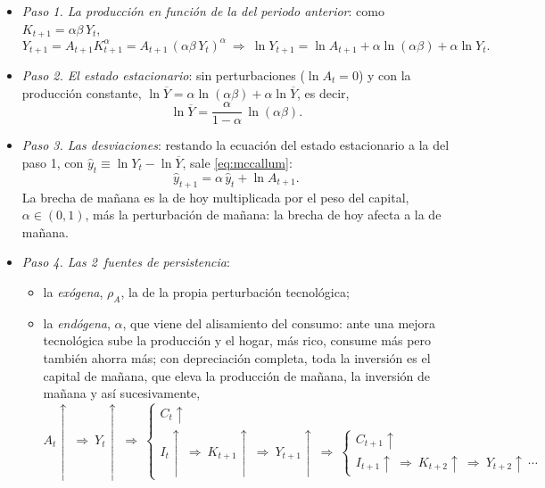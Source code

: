 \documentclass[11pt]{article}
\begin{document}
\begin{itemize}
\item \emph{Paso 1. La producción en función de la del periodo anterior}: como $K_{t+1}=\alpha\beta\,Y_t$,
  \begin{equation*}
  Y_{t+1}=A_{t+1}K_{t+1}^{\alpha}=A_{t+1}\,(\alpha\beta\,Y_t)^{\alpha}\ \Longrightarrow\ \ln Y_{t+1}=\ln A_{t+1}+\alpha\ln(\alpha\beta)+\alpha\ln Y_t .
  \end{equation*}
\item \emph{Paso 2. El estado estacionario}: sin perturbaciones ($\ln A_t=0$) y con la producción constante, $\ln\overline Y=\alpha\ln(\alpha\beta)+\alpha\ln\overline Y$, es decir,
  \begin{equation*}
  \ln\overline Y=\frac{\alpha}{1-\alpha}\,\ln(\alpha\beta).
  \end{equation*}
\item \emph{Paso 3. Las desviaciones}: restando la ecuación del estado estacionario a la del paso 1, con $\hat y_t\equiv\ln Y_t-\ln\overline Y$, sale \eqref{eq:mccallum}:
  \begin{equation*}
  \hat y_{t+1}=\alpha\,\hat y_t+\ln A_{t+1}.
  \end{equation*}
  La brecha de mañana es la de hoy multiplicada por el peso del capital, $\alpha\in(0,1)$, más la perturbación de mañana: la brecha de hoy afecta a la de mañana.
\item \emph{Paso 4. Las 2~fuentes de persistencia}:
  \begin{itemize}
  \item la \emph{exógena}, $\rho_A$, la de la propia perturbación tecnológica;
  \item la \emph{endógena}, $\alpha$, que viene del alisamiento del consumo: ante una mejora tecnológica sube la producción y el hogar, más rico, consume más pero también ahorra más; con depreciación completa, toda la inversión es el capital de mañana, que eleva la producción de mañana, la inversión de mañana y así sucesivamente,
  \begin{equation*}
  A_t\uparrow\ \Rightarrow\ Y_t\uparrow\ \Rightarrow\ \begin{cases}C_t\uparrow\\ I_t\uparrow\ \Rightarrow\ K_{t+1}\uparrow\ \Rightarrow\ Y_{t+1}\uparrow\ \Rightarrow\ \begin{cases}C_{t+1}\uparrow\\ I_{t+1}\uparrow\ \Rightarrow\ K_{t+2}\uparrow\ \Rightarrow\ Y_{t+2}\uparrow\ \cdots\end{cases}\end{cases}

\end{equation*}
\end{itemize}
\end{itemize}
\end{document}
